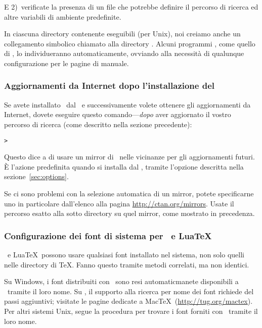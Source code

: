 \documentclass{article}
\begin{document}
E 2)~verificate la presenza di un file  che
potrebbe definire il percorso di ricerca ed altre variabili di ambiente
predefinite.

In ciascuna directory contenente eseguibili (per Unix), noi creiamo anche
un collegamento simbolico chiamato  alla directory
. Alcuni programmi , come quello di
\MacOSX, lo individueranno automaticamente, ovviando alla necessità di
qualunque configurazione per le pagine di manuale.


\subsubsection{Aggiornamenti da Internet dopo l'installazione del \DVD}
\label{sec:dvd-install-net-updates}

Se avete installato \TL\ dal \DVD\ e successivamente volete ottenere gli
aggiornamenti da Internet, dovete eseguire questo comando---\emph{dopo} aver
aggiornato il vostro percorso di ricerca (come descritto nella sezione
precedente):

\begin{alltt}
> 
\end{alltt}

Questo dice a  di usare un mirror di \CTAN\ nelle vicinanze
per gli aggiornamenti futuri. È l'azione predefinita quando si installa dal
\DVD, tramite l'opzione descritta nella sezione~\ref{sec:options}.

Se ci sono problemi con la selezione automatica di un mirror, potete
specificarne uno in particolare dall'elenco alla pagina
\url{http://ctan.org/mirrors}. Usate il percorso esatto alla sotto directory
 su quel mirror, come mostrato in precedenza.


\subsubsection{Configurazione dei font di sistema per \protect\XeTeX\protect\ e Lua\protect\TeX}
\label{sec:font-conf-sys}

\XeTeX\ e Lua\TeX\ possono usare qualsiasi font installato nel sistema,
non solo quelli nelle directory di \TeX. Fanno questo tramite metodi
correlati, ma non identici.

Su Windows, i font distribuiti con \TL\ sono resi automaticmanete
disponibili a \XeTeX\ tramite il loro nome. Su \MacOSX, il supporto
alla ricerca per nome dei font richiede del passi aggiuntivi; visitate
le pagine dedicate a Mac\TeX\ (\url{http://tug.org/mactex}). Per
altri sistemi Unix, segue la procedura per trovare i font forniti con
\TL\ tramite il loro nome.
\end{document}

